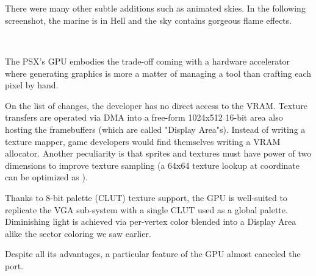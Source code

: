 \\

\\
\par


There were many other subtle additions such as animated skies. In the following screenshot, the marine is in Hell and the sky contains gorgeous flame effects.\\
\par
{}\\
\par
The PSX's GPU embodies the trade-off coming with a hardware accelerator where generating graphics is more a matter of managing a tool than crafting each pixel by hand.\\
\par
On the list of changes, the developer has no direct access to the VRAM. Texture transfers are operated via DMA into a free-form 1024x512 16-bit area also hosting the framebuffers (which are called "Display Area"s). Instead of writing a texture mapper, game developers would find themselves writing a VRAM allocator. Another peculiarity is that sprites and textures must have power of two dimensions to improve texture sampling (a 64x64 texture lookup at coordinate  can be optimized as ).\\
\par
Thanks to 8-bit palette (CLUT) texture support, the GPU is well-suited to replicate the VGA sub-system with a single CLUT used as a global palette. Diminishing light is achieved via per-vertex color blended into a Display Area alike the sector coloring we saw earlier.\\
\par
Despite all its advantages, a particular feature of the GPU almost canceled the port.


